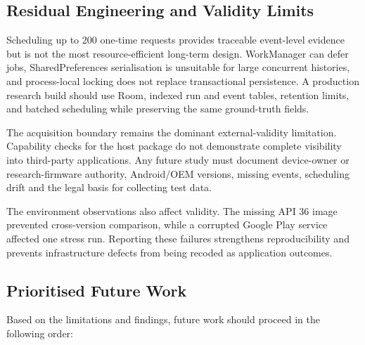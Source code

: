 \subsection{Residual Engineering and Validity Limits}

Scheduling up to 200 one-time requests provides traceable event-level evidence but is not the most resource-efficient long-term design. WorkManager can defer jobs, SharedPreferences serialisation is unsuitable for large concurrent histories, and process-local locking does not replace transactional persistence. A production research build should use Room, indexed run and event tables, retention limits, and batched scheduling while preserving the same ground-truth fields.

The acquisition boundary remains the dominant external-validity limitation. Capability checks for the host package do not demonstrate complete visibility into third-party applications. Any future study must document device-owner or research-firmware authority, Android/OEM versions, missing events, scheduling drift and the legal basis for collecting test data.

The environment observations also affect validity. The missing API 36 image prevented cross-version comparison, while a corrupted Google Play service affected one stress run. Reporting these failures strengthens reproducibility and prevents infrastructure defects from being recoded as application outcomes.

\subsection{Prioritised Future Work}

Based on the limitations and findings, future work should proceed in the following order:

